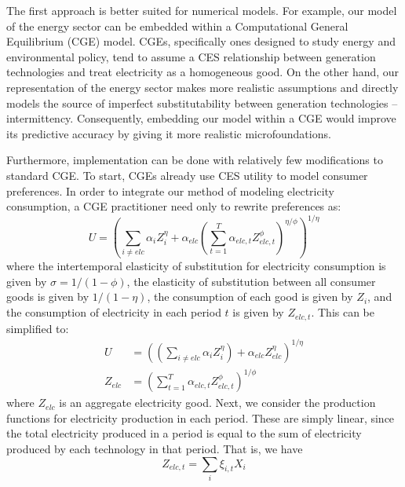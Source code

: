 \documentclass[11pt,a4paper,leqno]{extarticle}
\begin{document}
	The first approach is better suited for numerical models. For example, our model of the energy sector can be embedded within a Computational General Equilibrium (CGE) model. CGEs, specifically ones designed to study energy and environmental policy, tend to assume a CES relationship between generation technologies and treat electricity as a homogeneous good. On the other hand, our representation of the energy sector makes more realistic assumptions and directly models the source of imperfect substitutability between generation technologies -- intermittency. Consequently, embedding our model within a CGE would improve its predictive accuracy by giving it more realistic microfoundations. 
	
	Furthermore, implementation can be done with relatively few modifications to standard CGE. To start, CGEs already use CES utility to model consumer preferences. In order to integrate our method of modeling electricity consumption, a CGE practitioner need only to rewrite preferences as:
	\begin{equation}
	U =   \left( \sum_{i \neq elc} \alpha_{i} Z_{i}^\eta +  \alpha_{elc} \left( \sum_{t=1}^T \alpha_{elc,t} Z_{elc, t}^\phi \right)^{\eta/\phi} \right)^{1/\eta}
	\end{equation}
	where the intertemporal elasticity of substitution for electricity consumption is given by $\sigma = 1/(1-\phi)$,  the elasticity of substitution between all consumer goods is given by $1/(1-\eta)$, the consumption of each good is given by $Z_{i}$, and the consumption of electricity in each period $t$ is given by $Z_{elc, t}$. This can be simplified to: 
	\begin{align}
	U &= \left(  \left( \sum_{i \neq elc} \alpha_{i} Z_{i}^\eta \right) + \alpha_{elc} Z_{elc}^\eta \right)^{1/\eta} \\
	Z_{elc} &= \left(  \sum_{t=1}^T \alpha_{elc,t} Z_{elc, t}^\phi \right)^{1/\phi}
	\end{align}
	where $Z_{elc}$ is an aggregate electricity good. Next, we consider the production functions for electricity production in each period. These are simply linear, since the total  electricity produced in a period is equal to the sum of electricity produced by each technology in that period. That is, we have 
	\begin{equation}
	Z_{elc,t} = \sum_i \xi_{i,t} X_i 
	\end{equation}
\end{document}
